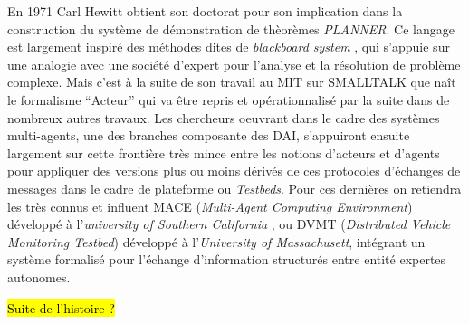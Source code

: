
En 1971 Carl Hewitt obtient son doctorat pour son implication dans la construction du système de démonstration de thèorèmes \textit{PLANNER}. Ce langage est largement inspiré des méthodes dites de \textit{blackboard system} , qui s'appuie sur une analogie avec une société d'expert pour l'analyse et la résolution de problème complexe. Mais c'est à la suite de son travail au MIT sur SMALLTALK  que naît le formalisme \enquote{Acteur}  qui va être repris et opérationnalisé par la suite dans de nombreux autres travaux. Les chercheurs oeuvrant dans le cadre des systèmes multi-agents, une des branches composante des DAI, s'appuiront ensuite largement sur cette frontière très mince entre les notions d'acteurs et d'agents pour appliquer des versions plus ou moins dérivés de ces protocoles d'échanges de messages dans le cadre de plateforme ou \textit{Testbeds}. Pour ces dernières on retiendra les très connus et influent MACE (\textit{Multi-Agent Computing Environment}) développé à l'\textit{university of Southern California} , ou DVMT (\textit{Distributed Vehicle Monitoring Testbed}) développé à l'\textit{University of Massachusett}, intégrant un système formalisé pour l'échange d'information structurés entre entité expertes autonomes.

\hl{Suite de l'histoire ? }

